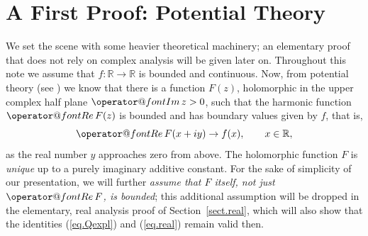 \documentclass[10pt]{amsart}
\makeatletter
\newcommand{\R}{{\mathbb  R}}
\renewcommand{\Re}{{\operator@font Re\,}}
\renewcommand{\Im}{{\operator@font Im\,}}
\makeatother
\begin{document}
\section{A First Proof: Potential Theory}
\noindent
We set the scene with some heavier theoretical machinery; an elementary proof that does not
rely on complex analysis will be given later on. Throughout this note we assume that $f:\R \to \R$ is bounded and continuous.
Now, from potential theory (see \cite[Thms. 15.1a, 15.4d]{Hen}) we know that there is a function $F(z)$, holomorphic
in the upper complex half plane $\Im z >0$, such that the harmonic function $\Re F(z)$ is bounded and has boundary values given by $f$, that is,
\begin{equation}\label{eq.F}
\Re F(x+ i y) \to f(x), \qquad x\in\R,
\end{equation}
as the real number $y$ approaches zero from above. The holomorphic function $F$ is \emph{unique}
up to a purely imaginary additive constant. For the sake of simplicity of our presentation, we will further
{\em assume that $F$ itself, not just $\Re F$, is bounded}\/; this additional assumption will be dropped
in the elementary, real analysis proof of Section~\ref{sect.real}, which  will also show that the identities (\ref{eq.Qexpl}) and (\ref{eq.real})
remain valid then.
\end{document}
